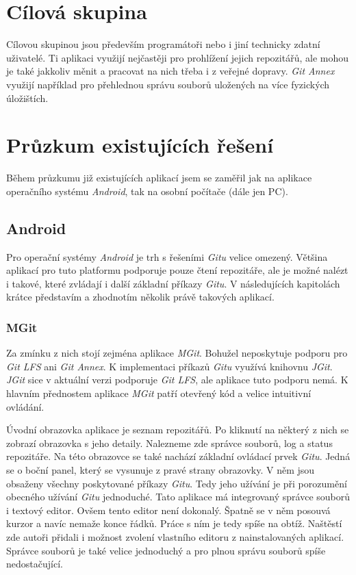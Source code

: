 \section{Cílová skupina}
Cílovou skupinou jsou především programátoři nebo i jiní technicky zdatní uživatelé. Ti aplikaci využijí nejčastěji pro prohlížení jejich repozitářů, ale mohou je také jakkoliv měnit a pracovat na nich třeba i z veřejné dopravy. \emph{Git Annex} využijí například pro přehlednou správu souborů uložených na více fyzických úložištích.

\section{Průzkum existujících řešení}
Během průzkumu již existujících aplikací jsem se zaměřil jak na aplikace operačního systému \emph{Android}, tak na osobní počítače (dále jen PC).

    \subsection {Android}
    Pro operační systémy \emph{Android} je trh s řešeními \emph{Gitu} velice omezený. Většina aplikací pro tuto platformu podporuje pouze čtení repozitáře, ale je možné nalézt i takové, které zvládají i další základní příkazy \emph{Gitu}. V následujících kapitolách krátce představím a zhodnotím několik právě takových aplikací.

        \subsubsection{MGit~}
        Za zmínku z nich stojí zejména aplikace \emph{MGit}. Bohužel neposkytuje podporu pro \emph{Git LFS} ani \emph{Git Annex}. K implementaci příkazů \emph{Gitu} využívá knihovnu \emph{JGit}. \emph{JGit} sice v aktuální verzi podporuje \emph{Git LFS}, ale aplikace tuto podporu nemá. K hlavním přednostem aplikace \emph{MGit} patří otevřený kód a velice intuitivní ovládání.

        Úvodní obrazovka aplikace je seznam repozitářů. Po kliknutí na některý z nich se zobrazí obrazovka s jeho detaily. Nalezneme zde správce souborů, log a status repozitáře. Na této obrazovce se také nachází základní ovládací prvek \emph{Gitu}. Jedná se o boční panel, který se vysunuje z pravé strany obrazovky. V něm jsou obsaženy všechny poskytované příkazy \emph{Gitu}. Tedy jeho užívání je při porozumění obecného užívání \emph{Gitu} jednoduché. Tato aplikace má integrovaný správce souborů i textový editor. Ovšem tento editor není dokonalý. Špatně se v něm posouvá kurzor a navíc nemaže konce řádků. Práce s ním je tedy spíše na obtíž. Naštěstí zde autoři přidali i možnost zvolení vlastního editoru z nainstalovaných aplikací. Správce souborů je také velice jednoduchý a pro plnou správu souborů spíše nedostačující.

